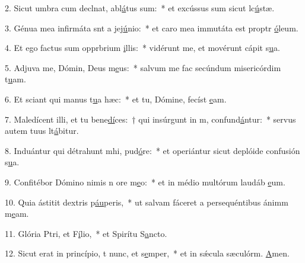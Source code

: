 2. Sicut umbra cum declnat, abl\uline{á}tus sum:~* et excússus sum sicut lc\uline{ú}stæ.\par 
3. Génua mea infirmáta snt a jej\uline{ú}nio:~* et caro mea immutáta est proptr \uline{ó}leum.\par 
4. Et ego factus sum opprbrium \uline{i}llis:~* vidérunt me, et movérunt cápit s\uline{u}a.\par 
5. Adjuva me, Dómin, Deus m\uline{e}us:~* salvum me fac secúndum misericórdim t\uline{u}am.\par 
6. Et sciant qui manus t\uline{u}a hæc:~* et tu, Dómine, fecíst \uline{e}am.\par 
7. Maledícent illi, et tu bene\uline{dí}ces:~† qui insúrgunt in m, confund\uline{á}ntur:~* servus autem tuus lt\uline{á}bitur.\par 
8. Induántur qui détrahunt mhi, pud\uline{ó}re:~* et operiántur sicut deplóide confusión s\uline{u}a.\par 
9. Confitébor Dómino nimis n ore m\uline{e}o:~* et in médio multórum laudáb \uline{e}um.\par 
10. Quia ástitit  dextris p\uline{áu}peris,~* ut salvam fáceret a persequéntibus ánimm m\uline{e}am.\par 
11. Glória Ptri, et F\uline{í}lio,~* et Spirítu S\uline{a}ncto.\par 
12. Sicut erat in princípio, t nunc, et s\uline{e}mper,~* et in sǽcula sæculórm. \uline{A}men.\par 
